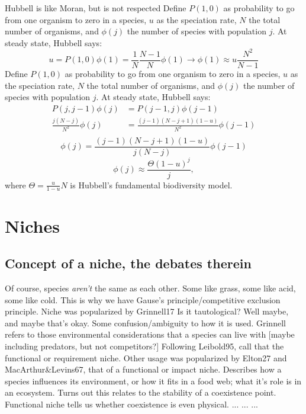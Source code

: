\documentclass[a4paper,11pt]{article}
\numberwithin{equation}{section} %
\begin{document}
Hubbell is like Moran, but is not respected
Define $P(1,0)$ as probability to go from one organism to zero in a species, $u$ as the speciation rate, $N$ the total number of organisms, and $\phi(j)$ the number of species with population $j$. 
At steady state, Hubbell says:
\begin{equation*}
u = P(1,0)\phi(1) = \frac{1}{N}\frac{N-1}{N}\phi(1) \rightarrow \phi(1) \approx u\frac{N^2}{N-1}
\end{equation*}
Define $P(1,0)$ as probability to go from one organism to zero in a species, $u$ as the speciation rate, $N$ the total number of organisms, and $\phi(j)$ the number of species with population $j$. 
At steady state, Hubbell says:
\begin{align*}
P(j,j-1)\phi(j) &= P(j-1,j)\phi(j-1) \\
\frac{j(N-j)}{N^2}\phi(j) &= \frac{(j-1)(N-j+1)(1-u)}{N^2}\phi(j-1) \\
\end{align*}
\begin{equation*}
\phi(j) = \frac{(j-1)(N-j+1)(1-u)}{j(N-j)}\phi(j-1)
\end{equation*}
\begin{equation*}
\phi(j) \approx \frac{\Theta (1-u)^j}{j},
\end{equation*}
where $\Theta = \frac{u}{1-u}N$ is Hubbell's fundamental biodiversity model. 









\section{Niches}
\subsection{Concept of a niche, the debates therein}
Of course, species \emph{aren't} the same as each other. Some like grass, some like acid, some like cold. 
This is why we have Gause's principle/competitive exclusion principle. 
Niche was popularized by Grinnell17
Is it tautological? Well maybe, and maybe that's okay. 
%
Some confusion/ambiguity to how it is used. 
Grinnell refers to those environmental considerations that a species can live with [maybe including predators, but not competitors?]
Following Leibold95, call that the functional or requirement niche. 
%
Other usage was popularized by Elton27 and MacArthur\&Levins67, that of a functional or impact niche. 
Describes how a species influences its environment, or how it fits in a food web; what it's role is in an ecosystem. 
Turns out this relates to the stability of a coexistence point. 
%
Functional niche tells us whether coexistence is even physical. 
...
...
...
\end{document}
